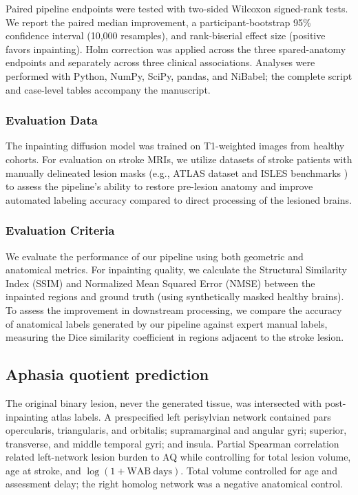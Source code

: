 \documentclass[runningheads]{llncs}
\begin{document}
Paired pipeline endpoints were tested with two-sided Wilcoxon signed-rank tests. We report the paired median improvement, a participant-bootstrap 95\% confidence interval (10,000 resamples), and rank-biserial effect size (positive favors inpainting). Holm correction was applied across the three spared-anatomy endpoints and separately across three clinical associations. Analyses were performed with Python, NumPy, SciPy, pandas, and NiBabel; the complete script and case-level tables accompany the manuscript.



\subsubsection{Evaluation Data}
The inpainting diffusion model was trained on T1-weighted images from healthy cohorts. For evaluation on stroke MRIs, we utilize datasets of stroke patients with manually delineated lesion masks (e.g., ATLAS dataset \cite{Liew2022} and ISLES benchmarks \cite{Maier2015}) to assess the pipeline's ability to restore pre-lesion anatomy and improve automated labeling accuracy compared to direct processing of the lesioned brains.





\subsubsection{Evaluation Criteria}
We evaluate the performance of our pipeline using both geometric and anatomical metrics. For inpainting quality, we calculate the Structural Similarity Index (SSIM) and Normalized Mean Squared Error (NMSE) between the inpainted regions and ground truth (using synthetically masked healthy brains). To assess the improvement in downstream processing, we compare the accuracy of anatomical labels generated by our pipeline against expert manual labels, measuring the Dice similarity coefficient in regions adjacent to the stroke lesion.

\subsection{Aphasia quotient prediction}
The original binary lesion, never the generated tissue, was intersected with
post-inpainting atlas labels. A prespecified left perisylvian network contained
pars opercularis, triangularis, and orbitalis; supramarginal and angular gyri;
superior, transverse, and middle temporal gyri; and insula. Partial Spearman
correlation related left-network lesion burden to AQ while controlling for
total lesion volume, age at stroke, and $\log(1+\mathrm{WAB\ days})$. Total
volume controlled for age and assessment delay; the right homolog network was
a negative anatomical control.
\end{document}
